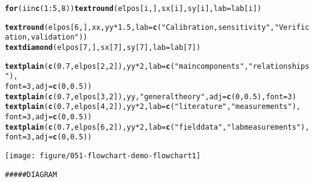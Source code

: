\documentclass{article}\usepackage{graphicx, color}
\makeatletter
\def\maxwidth{ %
  \ifdim\Gin@nat@width>\linewidth
    \linewidth
  \else
    \Gin@nat@width
  \fi
}
\newcommand{\hlfunctioncall}[1]{\textcolor[rgb]{0.501960784313725,0,0.329411764705882}{\textbf{#1}}}%
\newcommand{\hlstring}[1]{\textcolor[rgb]{0.6,0.6,1}{#1}}%
\newcommand{\hlcomment}[1]{\textcolor[rgb]{0.180392156862745,0.6,0.341176470588235}{#1}}%
\newenvironment{kframe}{%
 \def\at@end@of@kframe{}%
 \ifinner\ifhmode%
  \def\at@end@of@kframe{\end{minipage}}%
  \begin{minipage}{\columnwidth}%
 \fi\fi%
 \def\FrameCommand##1{\hskip\@totalleftmargin \hskip-\fboxsep
 \colorbox{shadecolor}{##1}\hskip-\fboxsep
     \hskip-\linewidth \hskip-\@totalleftmargin \hskip\columnwidth}%
 \MakeFramed {\advance\hsize-\width
   \@totalleftmargin\z@ \linewidth\hsize
   \@setminipage}}%
 {\par\unskip\endMakeFramed%
 \at@end@of@kframe}
\newenvironment{knitrout}{}{} %
\makeatother
\begin{document}
\begin{knitrout}
\begin{kframe}
\begin{alltt}
\hlfunctioncall{for} (i in \hlfunctioncall{c}(1:5, 8)) \hlfunctioncall{textround}(elpos[i, ], sx[i], sy[i], lab = lab[i])

\hlfunctioncall{textround}(elpos[6, ], xx, yy * 1.5, lab = \hlfunctioncall{c}(\hlstring{"Calibration,sensitivity"}, \hlstring{"Verification,validation"}))
\hlfunctioncall{textdiamond}(elpos[7, ], sx[7], sy[7], lab = lab[7])

\hlfunctioncall{textplain}(\hlfunctioncall{c}(0.7, elpos[2, 2]), yy * 2, lab = \hlfunctioncall{c}(\hlstring{"main components"}, \hlstring{"relationships"}), 
    font = 3, adj = \hlfunctioncall{c}(0, 0.5))
\hlfunctioncall{textplain}(\hlfunctioncall{c}(0.7, elpos[3, 2]), yy, \hlstring{"general theory"}, adj = \hlfunctioncall{c}(0, 0.5), font = 3)
\hlfunctioncall{textplain}(\hlfunctioncall{c}(0.7, elpos[4, 2]), yy * 2, lab = \hlfunctioncall{c}(\hlstring{"literature"}, \hlstring{"measurements"}), 
    font = 3, adj = \hlfunctioncall{c}(0, 0.5))
\hlfunctioncall{textplain}(\hlfunctioncall{c}(0.7, elpos[6, 2]), yy * 2, lab = \hlfunctioncall{c}(\hlstring{"field data"}, \hlstring{"lab measurements"}), 
    font = 3, adj = \hlfunctioncall{c}(0, 0.5))
\end{alltt}
\end{kframe}
\texttt{[image: figure/051-flowchart-demo-flowchart1]} 
\begin{kframe}\begin{alltt}

\hlcomment{##### DIAGRAM}


\end{alltt}
\end{kframe}
\end{knitrout}
\end{document}
